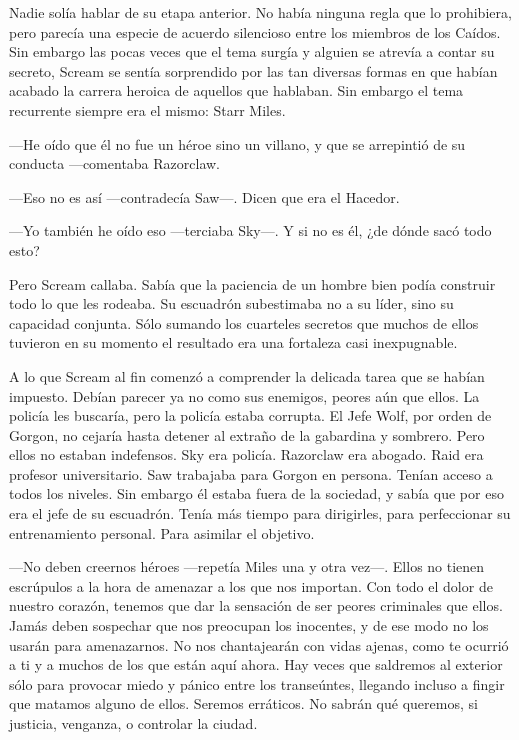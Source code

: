 Nadie solía hablar de su etapa anterior. No había ninguna regla que lo prohibiera, pero parecía una especie de acuerdo silencioso entre los miembros de los Caídos. Sin embargo las pocas veces que el tema surgía y alguien se atrevía a contar su secreto, Scream se sentía sorprendido por las tan diversas formas en que habían acabado la carrera heroica de aquellos que hablaban. Sin embargo el tema recurrente siempre era el mismo: Starr Miles.

---He oído que él no fue un héroe sino un villano, y que se arrepintió de su conducta ---comentaba Razorclaw.

---Eso no es así ---contradecía Saw---. Dicen que era el Hacedor.

---Yo también he oído eso ---terciaba Sky---. Y si no es él, ¿de dónde sacó todo esto?

Pero Scream callaba. Sabía que la paciencia de un hombre bien podía construir todo lo que les rodeaba. Su escuadrón subestimaba no a su líder, sino su capacidad conjunta. Sólo sumando los cuarteles secretos que muchos de ellos tuvieron en su momento el resultado era una fortaleza casi inexpugnable.

A lo que Scream al fin comenzó a comprender la delicada tarea que se habían impuesto. Debían parecer ya no como sus enemigos, peores aún que ellos. La policía les buscaría, pero la policía estaba corrupta. El Jefe Wolf, por orden de Gorgon, no cejaría hasta detener al extraño de la gabardina y sombrero. Pero ellos no estaban indefensos. Sky era policía. Razorclaw era abogado. Raid era profesor universitario. Saw trabajaba para Gorgon en persona. Tenían acceso a todos los niveles. Sin embargo él estaba fuera de la sociedad, y sabía que por eso era el jefe de su escuadrón. Tenía más tiempo para dirigirles, para perfeccionar su entrenamiento personal. Para asimilar el objetivo.

---No deben creernos héroes ---repetía Miles una y otra vez---. Ellos no tienen escrúpulos a la hora de amenazar a los que nos importan. Con todo el dolor de nuestro corazón, tenemos que dar la sensación de ser peores criminales que ellos. Jamás deben sospechar que nos preocupan los inocentes, y de ese modo no los usarán para amenazarnos. No nos chantajearán con vidas ajenas, como te ocurrió a ti y a muchos de los que están aquí ahora. Hay veces que saldremos al exterior sólo para provocar miedo y pánico entre los transeúntes, llegando incluso a fingir que matamos alguno de ellos. Seremos erráticos. No sabrán qué queremos, si justicia, venganza, o controlar la ciudad.

